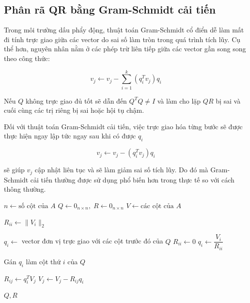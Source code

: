 \subsection{Phân rã QR bằng Gram-Schmidt cải tiến}

Trong môi trường dấu phẩy động, thuật toán Gram-Schmidt cổ điển dễ làm mất đi tính trực giao giữa các vector do sai số làm tròn trong quá trình tích lũy. Cụ thể hơn, nguyên nhân nằm ở các phép trừ liên tiếp giữa các vector gần song song theo công thức:

\begin{equation}
    v_j \leftarrow v_j - \sum_{i = 1}^{k}(q_i^T v_j)q_i
\end{equation}

\noindent Nếu $Q$ không trực giao đủ tốt sẽ dẫn đến $Q^TQ \neq I$ và làm cho lặp $QR$ bị sai và cuối cùng các trị riêng bị sai hoặc hội tụ chậm.

Đối với thuật toán Gram-Schmidt cải tiến, việc trực giao hóa từng bước sẽ được thực hiện ngay lập tức ngay sau khi có được $q_i$

\begin{equation}
    v_j \leftarrow v_j - (q_i^T v_j)q_i
\end{equation}

\noindent sẽ giúp $v_j$ cập nhật liên tục và sẽ làm giảm sai số tích lũy. Do đó mà Gram-Schmidt cải tiến thường được sử dụng phổ biến hơn trong thực tế so với cách thông thường.

\newpage

\begin{algorithm}[H]
\caption{}
\begin{algorithmic}[1]
    \State $n \gets \text{số cột của } A$
    \State $Q \gets 0_{n \times n}, \; R \gets 0_{n \times n}$
    \State $V \gets \text{các cột của } A$

        \State $R_{ii} \gets \|V_i\|_2$
        
            \State $q_i \gets$ vector đơn vị trực giao với các cột trước đó của $Q$
            \State $R_{ii} \gets 0$
        \Else
            \State $q_i \gets \dfrac{V_i}{R_{ii}}$
        \EndIf
        
        \State Gán $q_i$ làm cột thứ $i$ của $Q$
        
            \State $R_{ij} \gets q_i^T V_j$
            \State $V_j \gets V_j - R_{ij} q_i$
        \EndFor
    \EndFor

    \State \Return $Q, R$
\EndProcedure
\end{algorithmic}
\end{algorithm}

